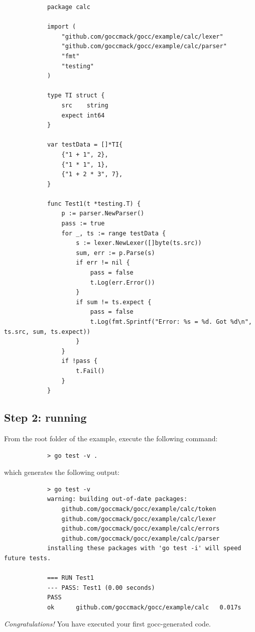 \documentclass[12pt]{article}
\begin{document}
		\begin{verbatim}
			package calc

			import (
			    "github.com/goccmack/gocc/example/calc/lexer"
			    "github.com/goccmack/gocc/example/calc/parser"
			    "fmt"
			    "testing"
			)

			type TI struct {
			    src    string
			    expect int64
			}

			var testData = []*TI{
			    {"1 + 1", 2},
			    {"1 * 1", 1},
			    {"1 + 2 * 3", 7},
			}

			func Test1(t *testing.T) {
			    p := parser.NewParser()
			    pass := true
			    for _, ts := range testData {
			        s := lexer.NewLexer([]byte(ts.src))
			        sum, err := p.Parse(s)
			        if err != nil {
			            pass = false
			            t.Log(err.Error())
			        }
			        if sum != ts.expect {
			            pass = false
			            t.Log(fmt.Sprintf("Error: %s = %d. Got %d\n", ts.src, sum, ts.expect))
			        }
			    }
			    if !pass {
			        t.Fail()
			    }
			}
		\end{verbatim}

	\subsection{Step 2: running }
		From the root folder of the  example, execute the following command:

		\begin{verbatim}
			> go test -v .
		\end{verbatim}

		which generates the following output:

		\begin{verbatim}
			> go test -v
			warning: building out-of-date packages:
			    github.com/goccmack/gocc/example/calc/token
			    github.com/goccmack/gocc/example/calc/lexer
			    github.com/goccmack/gocc/example/calc/errors
			    github.com/goccmack/gocc/example/calc/parser
			installing these packages with 'go test -i' will speed future tests.

			=== RUN Test1
			--- PASS: Test1 (0.00 seconds)
			PASS
			ok      github.com/goccmack/gocc/example/calc	0.017s
		\end{verbatim}

		{\em Congratulations!} You have executed your first gocc-generated code.
\end{document}
